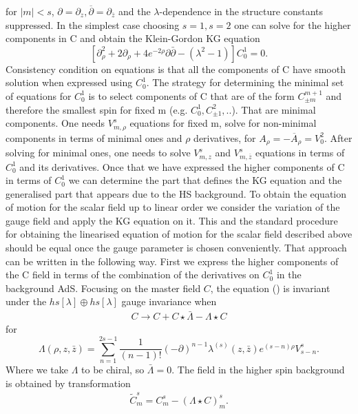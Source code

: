 \documentclass[prd,superscriptaddress,twocolumn,10pt]{revtex4}
\begin{document}
for $|m|<s$, $\partial=\partial_z,\overline{\partial}=\partial_{\overline{z}}$ and the $\lambda$-dependence in the structure constants suppressed. 
In the simplest case choosing $s=1,s=2$ one can solve for the higher components in C and obtain the Klein-Gordon KG equation 
\begin{equation}
\left[ \partial_{\rho}^2+2\partial_{\rho}+4e^{-2\rho}\partial\bar{\partial}-(\lambda^2-1) \right]C_0^1=0.
\end{equation}
 Consistency condition on equations is that all the components of C have smooth solution when expressed using $C_0^1$. The strategy for determining the minimal set of equations for $C_0^1$ is to select components of C that are of the form $C_{\pm m}^{m+1}$ and therefore the smallest spin for fixed m (e.g. $C_0^1, C_{\pm1}^2,..$). That are minimal components. 
 One needs $V_{m,\rho}^s$ equations for fixed m, solve for non-minimal components in terms of minimal ones and $\rho$ derivatives, for $A_{\rho}=-\overline{A}_{\rho}=V_{0}^2$. After solving for minimal ones, one needs to solve $V_{m,z}^s$ and $V_{m,\overline{z}}^s$ equations in terms of $C_0^1$ and its derivatives. 
Once that we have expressed the higher components of C in terms of $C_0^1$ we can determine the part that defines the KG equation and the
generalised part that appears due to the HS background.
To obtain the equation of motion for the scalar field up to linear order we consider the variation of the gauge field and apply the KG equation on it. This and the standard procedure for obtaining the linearised equation of motion for the scalar field described above
should be equal once the gauge parameter is chosen conveniently.
That approach can be written in the following way.
First we express the higher components of the C field in terms of the combination of the derivatives on $C_0^1$ in the background AdS. 
Focusing on the master field $C$, the equation () is invariant under the $hs[\lambda]\oplus hs[\lambda]$  gauge invariance when 
\begin{align}
C\rightarrow C+C\star \bar{\Lambda}-\Lambda\star C 
\end{align}
for 
\begin{equation}
\Lambda(\rho,z,\bar{z})=\sum_{n=1}^{2s-1}\frac{1}{(n-1)!}(-\partial)^{n-1}\lambda^{(s)}(z,\bar{z})e^{(s-n)\rho}V^{s}_{s-n}. 
\end{equation}
Where we take $\Lambda$ to be chiral, so $\bar{\Lambda}=0$.
The field in the higher spin background is obtained by transformation
\begin{align}
\tilde{C}_m^s=C_m^s-(\Lambda\star C)^s_m.
\end{align}
\end{document}
